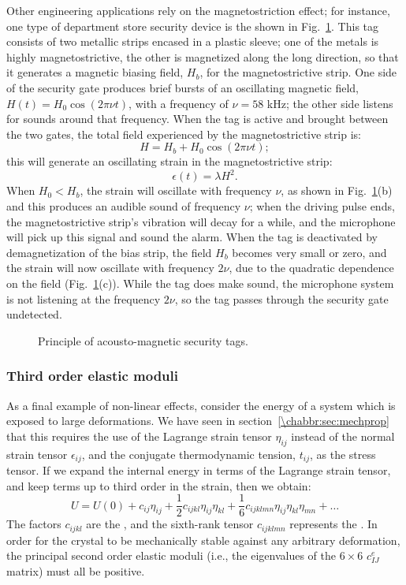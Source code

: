 Other engineering applications rely on the magnetostriction effect; for instance, one type of department store security device is the  shown in Fig.~\ref{\chabbr:fig:acoustomagnetic}.  This tag consists of two metallic strips encased in a plastic sleeve; one of the metals is highly magnetostrictive, the other is magnetized along the long direction, so that it generates a magnetic biasing field, $H_b$, for the magnetostrictive strip.  One side of the security gate produces brief bursts of an oscillating magnetic field, $H(t)=H_0\cos(2\pi\nu t)$, with a frequency of $\nu=58$ kHz; the other side listens for sounds around that frequency. When the tag is active and brought between the two gates, the total field experienced by the magnetostrictive strip is:
\[
	H = H_b + H_0\cos(2\pi\nu t);
\]
this will generate an oscillating strain in the magnetostrictive strip:
\[
	\epsilon(t) = \lambda H^2.
\]
When $H_0<H_b$, the strain will oscillate with frequency $\nu$, as shown in Fig.~\ref{\chabbr:fig:acoustomagnetic}(b) and this produces an audible sound of frequency $\nu$; when the driving pulse ends, the magnetostrictive strip's vibration will decay for a while, and the microphone will pick up this signal and sound the alarm. When the tag is deactivated by demagnetization of the bias strip, the field $H_b$ becomes very small or zero, and the strain will now oscillate with frequency $2\nu$, due to the quadratic dependence on the field (Fig.~\ref{\chabbr:fig:acoustomagnetic}(c)).  While the tag does make sound, the microphone system is not listening at the frequency $2\nu$, so the tag passes through the security gate undetected.


\begin{figure}[ht]
\centering\leavevmode
\caption{Principle of acousto-magnetic security tags.}
\label{\chabbr:fig:acoustomagnetic}
\end{figure}


\subsubsection{Third order elastic moduli}\label{\chabbr:sec:TOEM}

As a final example of non-linear effects, consider the energy of a system which is exposed to large deformations.  We have seen in section~\ref{\chabbr:sec:mechprop} that this requires the use of the Lagrange strain tensor $\eta_{ij}$ instead of the normal strain tensor $\epsilon_{ij}$, and the conjugate thermodynamic tension, $t_{ij}$, as the stress tensor. If we expand the internal energy in terms of the Lagrange strain tensor, and keep terms up to third order in the strain, then we obtain:
\[
	U = U(0) + c_{ij}\eta_{ij} + \frac{1}{2}c_{ijkl}\eta_{ij}\eta_{kl} + \frac{1}{6}c_{ijklmn}\eta_{ij}\eta_{kl}\eta_{mn} + \ldots
\]
The factors $c_{ijkl}$ are the , and the sixth-rank tensor $c_{ijklmn}$ represents the .  In order for the crystal to be mechanically stable against any arbitrary deformation, the principal second order elastic moduli (i.e., the eigenvalues of the $6\times 6$ $c^e_{IJ}$ matrix) must all be positive.  

